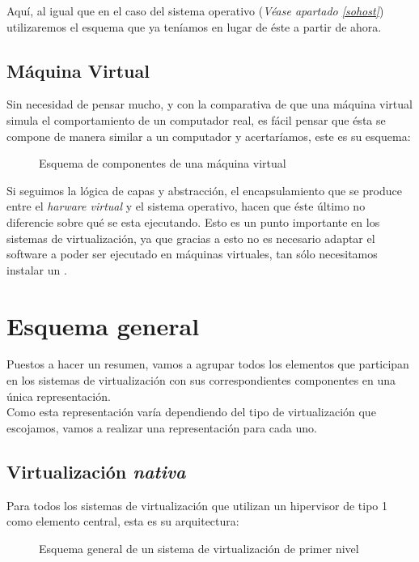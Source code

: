 Aquí, al igual que en el caso del sistema operativo (\textit{Véase apartado \ref{sohost}}) utilizaremos el esquema que ya teníamos en lugar de éste a partir de ahora.

\subsection{Máquina Virtual}\label{apartadomaqvir}
Sin necesidad de pensar mucho, y con la comparativa de que una máquina virtual simula el comportamiento de un computador real, es fácil pensar que ésta se compone de manera similar a un computador y acertaríamos, este es su esquema:

\begin{figure}[H]
\begin{center}
\end{center}
\caption[Maquina Virtual]{Esquema de componentes de una máquina virtual}
\end{figure}

Si seguimos la lógica de capas y abstracción, el encapsulamiento que se produce entre el \emph{harware virtual} y el sistema operativo, hacen que éste último no diferencie sobre qué se esta ejecutando. Esto es un punto importante en los sistemas de virtualización, ya que gracias a esto no es necesario adaptar el software a poder ser ejecutado en máquinas virtuales, tan sólo necesitamos instalar un .


\section{Esquema general}
Puestos a hacer un resumen, vamos a agrupar todos los elementos que participan en los sistemas de virtualización con sus correspondientes componentes en una única representación.\\

Como esta representación varía dependiendo del tipo de virtualización que escojamos, vamos a realizar una representación para cada uno.

\subsection{Virtualización \emph{nativa}}
Para todos los sistemas de virtualización que utilizan un hipervisor de tipo 1 como elemento central, esta es su arquitectura:

\begin{figure}[H]
\begin{center}
\end{center}
\caption[Virtualización \emph{nativa}]{Esquema general de un sistema de virtualización de primer nivel}
\end{figure}

